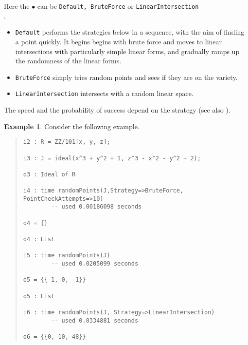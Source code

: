 \documentclass[11pt]{amsart}
\theoremstyle{definition}
\newtheorem{example}{Example}[section]
\begin{document}
    \begin{description}%
        \setlength{\itemsep}{5pt}
    \item[\tt Strategy => $\bullet$]   Here the $\bullet$ can be {\tt Default, BruteForce} or {\tt LinearIntersection} \\ .

    \begin{itemize}
    \item {\tt Default} performs the strategies below in a sequence, with the aim of finding a point quickly.  It begins begins with brute force and moves to linear intersections with particularly simple linear forms, and gradually ramps up the randomness of the linear forms.  
    \item {\tt BruteForce} simply tries random points and sees if they are on the variety.
           
    \item {\tt LinearIntersection} intersects with a random linear space.  
    \end{itemize}

    The speed and the probability of success depend on the strategy (see also ).

    \begin{example}\label{BruteForce}
        Consider the following example.
        ~~        
        {\small\color{blue}
    \begin{quote}
\begin{verbatim}
i2 : R = ZZ/101[x, y, z];

i3 : J = ideal(x^3 + y^2 + 1, z^3 - x^2 - y^2 + 2);

o3 : Ideal of R

i4 : time randomPoints(J,Strategy=>BruteForce, PointCheckAttempts=>10)
        -- used 0.00186098 seconds        

o4 = {}

o4 : List

i5 : time randomPoints(J)
        -- used 0.0205099 seconds

o5 = {{-1, 0, -1}}

o5 : List

i6 : time randomPoints(J, Strategy=>LinearIntersection)
        -- used 0.0334881 seconds                

o6 = {{0, 10, 48}}
\end{verbatim}
    \end{quote}
        }
    \end{example}%
    \vspace{-1em}



\end{description}
\end{document}
